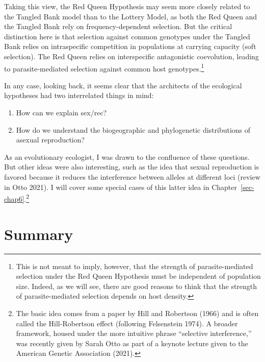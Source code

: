 \documentclass[
  letterpaper,
]{book}
\providecommand{\tightlist}{%
  \setlength{\itemsep}{0pt}\setlength{\parskip}{0pt}}\usepackage{longtable,booktabs,array}
\begin{document}
Taking this view, the Red Queen Hypothesis may seem more closely related
to the Tangled Bank model than to the Lottery Model, as both the Red
Queen and the Tangled Bank rely on frequency-dependent selection. But
the critical distinction here is that selection against common genotypes
under the Tangled Bank relies on intraspecific competition in
populations at carrying capacity (soft selection). The Red Queen relies
on interspecific antagonistic coevolution, leading to parasite-mediated
selection against common host genotypes.\footnote{This is not meant to
  imply, however, that the strength of parasite-mediated selection under
  the Red Queen Hypothesis must be independent of population size.
  Indeed, as we will see, there are good reasons to think that the
  strength of parasite-mediated selection depends on host density.}

In any case, looking back, it seems clear that the architects of the
ecological hypotheses had two interrelated things in mind:

\begin{enumerate}
\def\labelenumi{\arabic{enumi}.}
\tightlist
\item
  How can we explain sex/rec?
\item
  How do we understand the biogeographic and phylogenetic distributions
  of asexual reproduction?
\end{enumerate}

As an evolutionary ecologist, I was drawn to the confluence of these
questions. But other ideas were also interesting, such as the idea that
sexual reproduction is favored because it reduces the interference
between alleles at different loci (review in Otto 2021). I will cover
some special cases of this latter idea in
Chapter~\ref{sec-chap6}.\footnote{The basic idea comes from a paper by
  Hill and Robertson (1966) and is often called the Hill-Robertson
  effect (following Felsenstein 1974). A broader framework, housed under
  the more intuitive phrase ``selective interference,'' was recently
  given by Sarah Otto as part of a keynote lecture given to the American
  Genetic Association (2021).}

\section{Summary}\label{summary-1}
\end{document}
